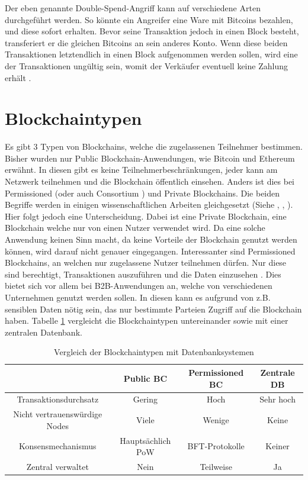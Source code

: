 Der eben genannte Double-Spend-Angriff kann auf verschiedene Arten durchgeführt werden. So könnte ein Angreifer eine Ware mit Bitcoins bezahlen, und diese sofort erhalten. Bevor seine Transaktion jedoch in einen Block besteht, transferiert er die gleichen Bitcoins an sein anderes Konto. Wenn diese beiden Transaktionen letztendlich in einen Block aufgenommen werden sollen, wird eine der Transaktionen ungültig sein, womit der Verkäufer eventuell keine Zahlung erhält \cite{AntonopoulosMasteringbitcoin2015}.

\section{Blockchaintypen}
Es gibt 3 Typen von Blockchains, welche die zugelassenen Teilnehmer bestimmen. Bisher wurden nur Public Blockchain-Anwendungen, wie Bitcoin und Ethereum erwähnt. In diesen gibt es keine Teilnehmerbeschränkungen, jeder kann am Netzwerk teilnehmen und die Blockchain öffentlich einsehen. Anders ist dies bei Permissioned (oder auch Consortium \cite{BenHamidaBlockchainEnterpriseOverview2017}) und Private Blockchains. Die beiden Begriffe werden in einigen wissenschaftlichen Arbeiten gleichgesetzt (Siehe \cite{Gramolidangerprivateblockchains2016}, \cite{PongnumkulPerformanceAnalysisPrivate2017}, \cite{LiScalablePrivateIndustrial2017}). Hier folgt jedoch eine Unterscheidung. Dabei ist eine Private Blockchain, eine Blockchain welche nur von einen Nutzer verwendet wird. Da eine solche Anwendung keinen Sinn macht, da keine Vorteile der Blockchain genutzt werden können, wird darauf nicht genauer eingegangen. Interessanter sind Permissioned Blockchains, an welchen nur zugelassene Nutzer teilnehmen dürfen. Nur diese sind berechtigt, Transaktionen auszuführen und die Daten einzusehen \cite{LiScalablePrivateIndustrial2017}. Dies bietet sich vor allem bei B2B-Anwendungen an, welche von verschiedenen Unternehmen genutzt werden sollen. In diesen kann es aufgrund von z.B. sensiblen Daten nötig sein, das nur bestimmte Parteien Zugriff auf die Blockchain haben. Tabelle \ref{tab:bc-comparison} vergleicht die Blockchaintypen untereinander sowie mit einer zentralen Datenbank.

\begin{table}[h]
    \centering
	\begin{tabular}{c c c c}
	\textbf{} & \textbf{Public BC} & \textbf{Permissioned BC}  & \textbf{Zentrale DB} \\ \hline
	Transaktionsdurchsatz & Gering & Hoch & Sehr hoch \\ \hline
    Nicht vertrauenswürdige Nodes & Viele & Wenige & Keine \\ \hline
    Konsensmechanismus & Hauptsächlich PoW & BFT-Protokolle & Keiner \\ \hline
    Zentral verwaltet & Nein & Teilweise & Ja \\
    \end{tabular}
    \caption{Vergleich der Blockchaintypen mit Datenbanksystemen \cite{WustyouneedBlockchain2017}\cite{ZhengBlockchainChallengesOpportunities2017}}
	\label{tab:bc-comparison}
\end{table}

